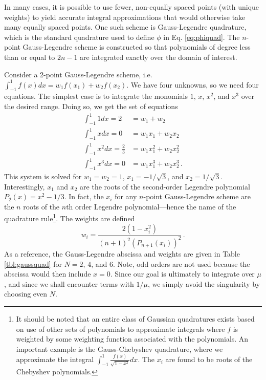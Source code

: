 In many cases, it is possible to use fewer, non-equally spaced points (with unique weights) to yield accurate integral approximations that would otherwise take many equally spaced points.  One such scheme is Gauss-Legendre quadrature, which is the standard quadrature used to define $\phi$ in Eq. \ref{eq:phiquad}.  The $n$-point Gauss-Legendre scheme is constructed so that polynomials of degree less than or equal to $2n-1$ are integrated exactly over the domain of interest.  

Consider a 2-point Gauss-Legendre scheme, i.e. $\int^{1}_{-1} f(x)dx = w_1 f(x_1) + w_2 f(x_2)$.  We have four unknowns, so we need four equations.  The simplest case is to integrate the monomials $1$, $x$, $x^2$, and $x^3$ over the desired range.  Doing so, we get the set of equations
\begin{equation}
 \begin{split}
   \int^1_{-1} 1   dx = 2           & = w_1 + w_2  \\
   \int^1_{-1} x   dx = 0           & = w_1 x_1 + w_2 x_2  \\
   \int^1_{-1} x^2 dx = \frac{2}{3} & = w_1 x^2_1 + w_2 x^2_2  \\
   \int^1_{-1} x^3 dx = 0           & = w_1 x^3_1 + w_2 x^3_2  \, .
 \end{split}
\end{equation}
This system is solved for $w_1 = w_2 = 1$, $x_1 = -1/\sqrt{3}$, and $x_2 = 1/\sqrt{3}$.  Interestingly, $x_1$ and $x_2$ are the roots of the second-order Legendre polynomial $P_2(x) = x^2 - 1/3$.  In fact, the $x_i$ for any $n$-point Gauss-Legendre scheme are the $n$ roots of the $n$th order Legendre polynomial---hence the name of the quadrature rule\footnote{It should be noted that an entire class of Gaussian quadratures exists based on use of other sets of polynomials to approximate integrals where $f$ is weighted by some weighting function associated with the polynomials.  An important example is the Gauss-Chebyshev quadrature, where we approximate the integral $\int^1_{-1} \frac{f(x)}{\sqrt{1-x^2}}dx$. The $x_i$ are found to be roots of the Chebyshev polynomials.}. The weights are defined
\begin{equation}
 w_i = \frac{2(1-x^2_i)}{(n+1)^2(P_{n+1}(x_i))^2} \, .
\end{equation}
As a reference, the Gauss-Legendre abscissa and weights are given in Table \ref{tbl:gaussquad} for $N=2$, $4$, and $6$.  Note, odd orders are not used because the abscissa would then include $x=0$.  Since our goal is ultimately to integrate over $\mu$, and since we shall encounter terms with $1/\mu$, we simply avoid the singularity by choosing even $N$.

